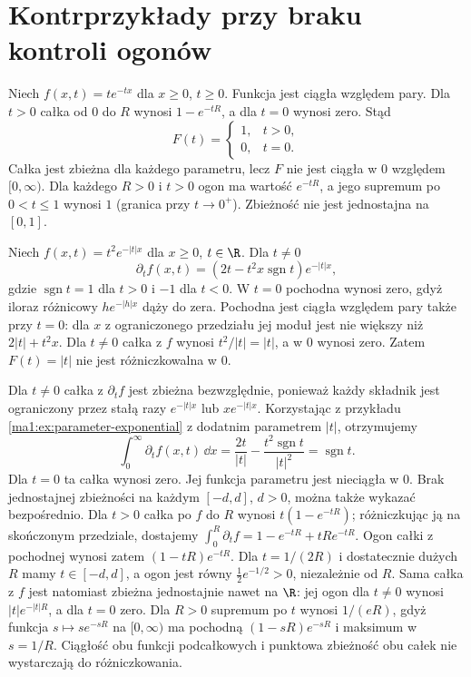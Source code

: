 \section{Kontrprzykłady przy braku kontroli ogonów}
\begin{przyklad}
\label{ma1:ex:improper-parameter-discontinuity}
Niech $f(x,t)=te^{-tx}$ dla $x\ge0$, $t\ge0$. Funkcja jest ciągła względem pary. Dla $t>0$ całka od $0$ do $R$ wynosi $1-e^{-tR}$, a dla $t=0$ wynosi zero. Stąd
\[
 F(t)=\begin{cases}1,&t>0,\\0,&t=0.\end{cases}
\]
Całka jest zbieżna dla każdego parametru, lecz $F$ nie jest ciągła w $0$ względem $[0,\infty)$. Dla każdego $R>0$ i $t>0$ ogon ma wartość $e^{-tR}$, a jego supremum po $0<t\le1$ wynosi $1$ (granica przy $t\to0^+$). Zbieżność nie jest jednostajna na $[0,1]$.
\end{przyklad}
\begin{przyklad}
\label{ma1:ex:improper-parameter-nondifferentiability}
Niech $f(x,t)=t^2 e^{-|t|x}$ dla $x\ge0$, $t\in\R$. Dla $t\ne0$
\[
 \partial_t f(x,t)=
 (2t-t^2x\operatorname{sgn}t)e^{-|t|x},
\]
gdzie $\operatorname{sgn}t=1$ dla $t>0$ i $-1$ dla $t<0$. W $t=0$ pochodna wynosi zero, gdyż iloraz różnicowy $h e^{-|h|x}$ dąży do zera. Pochodna jest ciągła względem pary także przy $t=0$: dla $x$ z ograniczonego przedziału jej moduł jest nie większy niż $2|t|+t^2x$. Dla $t\ne0$ całka z $f$ wynosi $t^2/|t|=|t|$, a w $0$ wynosi zero. Zatem $F(t)=|t|$ nie jest różniczkowalna w $0$.

Dla $t\ne0$ całka z $\partial_t f$ jest zbieżna bezwzględnie, ponieważ każdy składnik jest ograniczony przez stałą razy $e^{-|t|x}$ lub $xe^{-|t|x}$. Korzystając z przykładu \ref{ma1:ex:parameter-exponential} z dodatnim parametrem $|t|$, otrzymujemy
\[
 \int_0^\infty\partial_t f(x,t)\,\dd x
 =\frac{2t}{|t|}-\frac{t^2\operatorname{sgn}t}{|t|^2}
 =\operatorname{sgn}t.
\]
Dla $t=0$ ta całka wynosi zero. Jej funkcja parametru jest nieciągła w $0$. Brak jednostajnej zbieżności na każdym $[-d,d]$, $d>0$, można także wykazać bezpośrednio. Dla $t>0$ całka po $f$ do $R$ wynosi $t(1-e^{-tR})$; różniczkując ją na skończonym przedziale, dostajemy $\int_0^R\partial_t f=1-e^{-tR}+tRe^{-tR}$. Ogon całki z pochodnej wynosi zatem $(1-tR)e^{-tR}$. Dla $t=1/(2R)$ i dostatecznie dużych $R$ mamy $t\in[-d,d]$, a ogon jest równy $\tfrac12e^{-1/2}>0$, niezależnie od $R$. Sama całka z $f$ jest natomiast zbieżna jednostajnie nawet na $\R$: jej ogon dla $t\ne0$ wynosi $|t|e^{-|t|R}$, a dla $t=0$ zero. Dla $R>0$ supremum po $t$ wynosi $1/(eR)$, gdyż funkcja $s\mapsto se^{-sR}$ na $[0,\infty)$ ma pochodną $(1-sR)e^{-sR}$ i maksimum w $s=1/R$. Ciągłość obu funkcji podcałkowych i punktowa zbieżność obu całek nie wystarczają do różniczkowania.
\end{przyklad}


